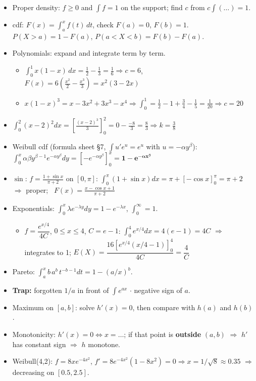 \documentclass[10pt]{article}
\newcommand{\trap}[1]{\textcolor{trap}{\textbf{Trap:} #1}}
\newcommand{\sub}[1]{\par\vspace{4pt}{\bfseries #1}\par\vspace{1pt}}
\begin{document}
\sub{B. Densities: constant $c$, cdf, probabilities, $E(X)$}
\begin{itemize}
\item Proper density: $f\ge0$ and $\int f=1$ on the support; find $c$ from $c\int(\dots)=1$.
\item cdf: $F(x)=\int_a^x f(t)\,dt$, check $F(a)=0$, $F(b)=1$. \quad $P(X>a)=1-F(a)$, \quad $P(a<X<b)=F(b)-F(a)$.
\item Polynomials: expand and integrate term by term.
  \begin{itemize}
  \item $\int_0^1 x(1-x)\,dx=\tfrac12-\tfrac13=\tfrac16 \Rightarrow c=6$, \quad $F(x)=6\left(\tfrac{x^2}{2}-\tfrac{x^3}{3}\right)=x^2(3-2x)$
  \item $x(1-x)^3=x-3x^2+3x^3-x^4 \Rightarrow \int_0^1=\tfrac12-1+\tfrac34-\tfrac15=\tfrac1{20} \Rightarrow c=20$
  \end{itemize}
\item $\int_0^2(x-2)^2dx=\left[\tfrac{(x-2)^3}{3}\right]_0^2=0-\tfrac{-8}{3}=\tfrac83 \Rightarrow k=\tfrac38$
\item Weibull cdf (formula sheet \S7, $\int u'e^u=e^u$ with $u=-\alpha y^\beta$): $\int_0^x\alpha\beta y^{\beta-1}e^{-\alpha y^\beta}dy=\left[-e^{-\alpha y^\beta}\right]_0^x=\mathbf{1-e^{-\alpha x^\beta}}$
\item $\sin$: $f=\frac{1+\sin x}{\pi+2}$ on $[0,\pi]$: $\int_0^\pi(1+\sin x)dx=\pi+[-\cos x]_0^\pi=\pi+2$ $\Rightarrow$ proper; \ $F(x)=\frac{x-\cos x+1}{\pi+2}$
\item Exponentials: $\int_0^x\lambda e^{-\lambda y}dy=1-e^{-\lambda x}$, \quad $\int_0^\infty=1$.
  \begin{itemize}
  \item $f=\dfrac{e^{x/4}}{4C}$, $0\le x\le4$, $C=e-1$: $\int_0^4e^{x/4}dx=4(e-1)=4C$ $\Rightarrow$ integrates to 1; \quad $E(X)=\dfrac{16\left[e^{x/4}(x/4-1)\right]_0^4}{4C}=\dfrac4C$
  \end{itemize}
\item Pareto: $\int_a^x b\,a^b\,t^{-b-1}dt=1-(a/x)^b$.
\item \trap{forgotten $1/a$ in front of $\int e^{ax}$ $\cdot$ negative sign of $a$.}
\end{itemize}

\sub{C. Derivatives (for $c$ in Accept-reject and monotonicity in Antithetic)}
\begin{itemize}
\item Maximum on $[a,b]$: solve $h'(x)=0$, then compare with $h(a)$ and $h(b)$.
\item Monotonicity: $h'(x)=0\Leftrightarrow x=\dots$; if that point is \textbf{outside} $(a,b)$ $\Rightarrow$ $h'$ has constant sign $\Rightarrow$ $h$ monotone.
\item Weibull(4,2): $f=8xe^{-4x^2}$, $f'=8e^{-4x^2}(1-8x^2)=0\Rightarrow x=1/\sqrt8\approx0.35$ $\Rightarrow$ decreasing on $[0.5,2.5]$.
\end{itemize}
\end{document}
